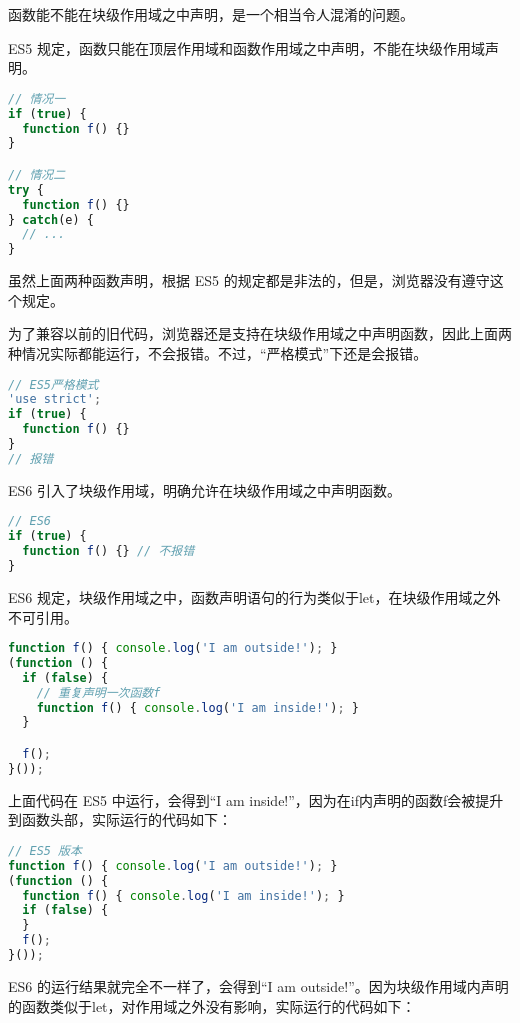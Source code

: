 函数能不能在块级作用域之中声明，是一个相当令人混淆的问题。

ES5 规定，函数只能在顶层作用域和函数作用域之中声明，不能在块级作用域声明。

\begin{lstlisting}[language=JavaScript]
// 情况一
if (true) {
  function f() {}
}

// 情况二
try {
  function f() {}
} catch(e) {
  // ...
}
\end{lstlisting}

虽然上面两种函数声明，根据 ES5 的规定都是非法的，但是，浏览器没有遵守这个规定。

为了兼容以前的旧代码，浏览器还是支持在块级作用域之中声明函数，因此上面两种情况实际都能运行，不会报错。不过，“严格模式”下还是会报错。

\begin{lstlisting}[language=JavaScript]
// ES5严格模式
'use strict';
if (true) {
  function f() {}
}
// 报错
\end{lstlisting}

ES6 引入了块级作用域，明确允许在块级作用域之中声明函数。



\begin{lstlisting}[language=JavaScript]
// ES6
if (true) {
  function f() {} // 不报错
}
\end{lstlisting}

ES6 规定，块级作用域之中，函数声明语句的行为类似于let，在块级作用域之外不可引用。


\begin{lstlisting}[language=JavaScript]
function f() { console.log('I am outside!'); }
(function () {
  if (false) {
    // 重复声明一次函数f
    function f() { console.log('I am inside!'); }
  }

  f();
}());
\end{lstlisting}


上面代码在 ES5 中运行，会得到“I am inside!”，因为在if内声明的函数f会被提升到函数头部，实际运行的代码如下：


\begin{lstlisting}[language=JavaScript]
// ES5 版本
function f() { console.log('I am outside!'); }
(function () {
  function f() { console.log('I am inside!'); }
  if (false) {
  }
  f();
}());
\end{lstlisting}



ES6 的运行结果就完全不一样了，会得到“I am outside!”。因为块级作用域内声明的函数类似于let，对作用域之外没有影响，实际运行的代码如下：



